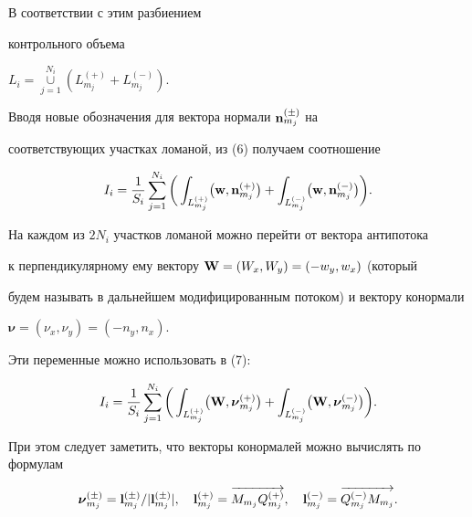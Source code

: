 \noindent{}В соответствии с этим разбиением


контрольного объема 


$L_i=\mathop{\cup}\limits_{j=1}^{N_i}(L_{m_j}^{(+)}+L_{m_j}^{(-)})$.


Вводя новые обозначения для вектора нормали ${\bold n}_{m_j}^{(\pm)}$ на


соответствующих участках ломаной, из (6) получаем соотношение


\begin{equation}


\lEq{8}


I_i = \frac{1}{S_i}\sum_{j=1}^{N_i}\bigg(


\int_{L_{m_j}^{(+)}}\bigl({\bold w},{\bold n}_{m_j}^{(+)}\bigr) + 


\int_{L_{m_j}^{(-)}}\bigl({\bold w},{\bold n}_{m_j}^{(-)}\bigr) 


\bigg).


\end{equation}


На каждом из $2N_i$ участков ломаной можно перейти от вектора антипотока


к перпендикулярному ему вектору ${\bold W}=(W_x,W_y)=(-w_y,w_x)$ (который


будем называть в дальнейшем модифицированным потоком) и вектору конормали


$\boldsymbol \nu=(\nu_x,\nu_y)=(-n_y,n_x)$.


Эти переменные можно использовать в (7):


\begin{equation}


\lEq{9}


I_i = \frac{1}{S_i}\sum_{j=1}^{N_i}\bigg(


\int_{L_{m_j}^{(+)}}\bigl({\bold W},\boldsymbol{\nu}_{m_j}^{(+)}\bigr) + 


\int_{L_{m_j}^{(-)}}\bigl({\bold W},\boldsymbol{\nu}_{m_j}^{(-)}\bigr) 


\bigg).


\end{equation}


При этом следует заметить, что векторы конормалей можно вычислять по формулам


\begin{equation}


\lEq{10}


\boldsymbol {\nu}_{m_j}^{(\pm)} =


{\bold l}_{m_j}^{(\pm)} / |{\bold l}_{m_j}^{(\pm)}|, \quad


{\bold l}_{m_j}^{(+)} = \overrightarrow{M_{m_j} Q_{m_j}^{(+)}}, \quad


{\bold l}_{m_j}^{(-)} = \overrightarrow{Q_{m_j}^{(-)}M_{m_j}}.


\end{equation}


